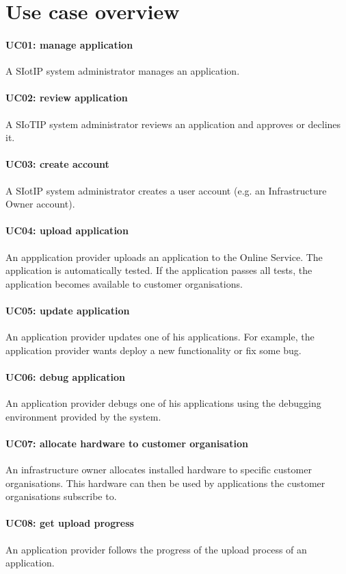\section{Use case overview}\label{sec:uc_overview}

\paragraph{UC01: manage application}
A SIotIP system administrator manages an application.
\paragraph{UC02: review application}
A SIoTIP system administrator reviews an application and approves or declines it.
\paragraph{UC03: create account}
A SIotIP system administrator creates a user account (e.g. an Infrastructure
Owner account).
\paragraph{UC04: upload application}
An appplication provider uploads an application to the Online Service.
The application is automatically tested. If the application passes all tests,
the application becomes available to customer organisations.
\paragraph{UC05: update application}
An application provider updates one of his applications.
For example, the application provider wants deploy a new functionality or fix
some bug.
\paragraph{UC06: debug application}
An application provider debugs one of his applications using the debugging
environment provided by the system.
\paragraph{UC07: allocate hardware to customer organisation}
An infrastructure owner allocates installed hardware to specific customer
organisations. This hardware can then be used by applications the customer
organisations subscribe to.
\paragraph{UC08: get upload progress}
An application provider follows the progress of the upload process of an
application.
